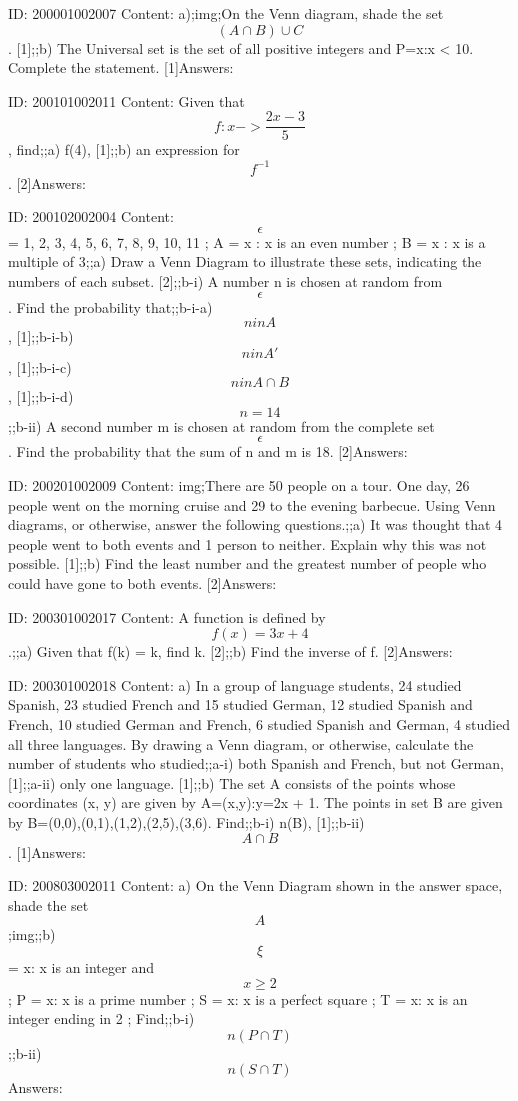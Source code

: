\documentclass{article}
\begin{document}
ID: 200001002007
Content:
a);img;On the Venn diagram, shade the set $$(A\cap B)\cup C$$. [1];;b) The Universal set is the set of all positive integers and P={x:x < 10}. Complete the statement. [1]Answers:

ID: 200101002011
Content:
Given that $$f:x -> \frac{2x-3}{5}$$, find;;a) f(4), [1];;b) an expression for $$f^{-1}$$. [2]Answers:

ID: 200102002004
Content:
$$\epsilon$$ = {1, 2, 3, 4, 5, 6, 7, 8, 9, 10, 11} ; A = {x : x is an even number} ; B = {x : x is a multiple of 3};;a) Draw a Venn Diagram to illustrate these sets, indicating the numbers of each subset. [2];;b-i) A number n is chosen at random from $$\epsilon$$. Find the probability that;;b-i-a) $$n in A$$, [1];;b-i-b) $$n in A'$$ , [1];;b-i-c) $$n in A \cap B$$, [1];;b-i-d) $$n = 14$$;;b-ii) A second number m is chosen at random from the complete set $$\epsilon$$. Find the probability that the sum of n and m is 18. [2]Answers:

ID: 200201002009
Content:
img;There are 50 people on a tour. One day, 26 people went on the morning cruise and 29 to the evening barbecue. Using Venn diagrams, or otherwise, answer the following questions.;;a) It was thought that 4 people went to both events and 1 person to neither. Explain why this was not possible. [1];;b) Find the least number and the greatest number of people who could have gone to both events. [2]Answers:

ID: 200301002017
Content:
A function is defined by $$f(x) = 3x + 4$$.;;a) Given that f(k) = k, find k. [2];;b) Find the inverse of f. [2]Answers:

ID: 200301002018
Content:
a) In a group of language students, 24 studied Spanish, 23 studied French and 15 studied	German, 12 studied Spanish and French, 10 studied German and French, 6 studied Spanish and German, 4 studied all three languages. By drawing a Venn diagram, or otherwise, calculate the number of students who studied;;a-i) both Spanish and French, but not German, [1];;a-ii) only one language. [1];;b) The set A consists of the points whose coordinates (x, y) are given by A={(x,y):y=2x + 1}. The points in set B are given by B={(0,0),(0,1),(1,2),(2,5),(3,6)}. Find;;b-i) n(B), [1];;b-ii) $$A \cap B$$. [1]Answers:

ID: 200803002011
Content:
a) On the Venn Diagram shown in the answer space, shade the set $$A$$;img;;b) $$\xi$$ = {x: x is an integer and $$x \geq  2$$} ; P = {x: x is a prime number} ; S = {x: x is a perfect square} ; T = {x: x is an integer ending in 2} ; Find;;b-i) $$n(P \cap T)$$;;b-ii) $$n(S \cap T)$$Answers:
\end{document}
